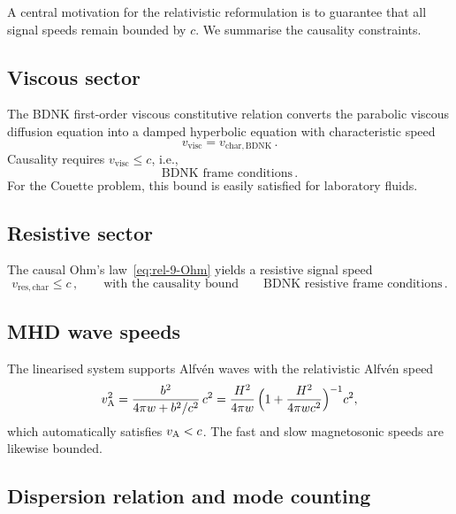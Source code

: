 A central motivation for the relativistic reformulation is to guarantee
that all signal speeds remain bounded by $c$.  We summarise the
causality constraints.

\subsection*{Viscous sector}

The BDNK first-order viscous constitutive relation converts the parabolic viscous
diffusion equation into a damped hyperbolic equation with characteristic
speed
\begin{equation}
  v_{\mathrm{visc}}
  = v_{\mathrm{char,BDNK}}\,.
  \label{eq:rel-causality-visc}
\end{equation}
Causality requires $v_{\mathrm{visc}} \le c$, i.e.,
\begin{equation}
  \text{BDNK frame conditions}\,.
  \label{eq:rel-causality-BDNK-frame}
\end{equation}
For the Couette problem, this bound is easily satisfied for laboratory
fluids.

\subsection*{Resistive sector}

The causal Ohm's law~\eqref{eq:rel-9-Ohm} yields a resistive signal
speed
\begin{equation}
  v_{\mathrm{res,char}} \leqslant c\,,
  \qquad\text{with the causality bound}\qquad
  \text{BDNK resistive frame conditions}\,.
  \label{eq:rel-causality-taueta}
\end{equation}

\subsection*{MHD wave speeds}

The linearised system supports Alfv\'en waves with the relativistic
Alfv\'en speed
\begin{equation}
  v_{\mathrm{A}}^2 = \frac{b^2}{4\pi w + b^2/c^2}\,c^2
  = \frac{H^2}{4\pi w}\,
    \Bigl(1 + \frac{H^2}{4\pi w c^2}\Bigr)^{-1} c^2,
  \label{eq:rel-Alfven}
\end{equation}
which automatically satisfies $v_{\mathrm{A}} < c$.  The fast and slow
magnetosonic speeds are likewise bounded.

\subsection*{Dispersion relation and mode counting}

